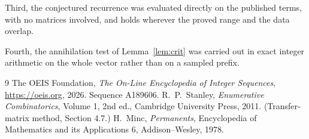 \documentclass[11pt,a4paper]{article}
\theoremstyle{plain}
\theoremstyle{definition}
\begin{document}
Third, the conjectured recurrence was evaluated directly on the published terms, with no
matrices involved, and holds wherever the proved range and the data overlap.

Fourth, the annihilation test of Lemma~\ref{lem:crit} was carried out in exact integer
arithmetic on the whole vector rather than on a sampled prefix.

\begin{thebibliography}{9}
 The OEIS Foundation, \emph{The On-Line Encyclopedia of Integer
Sequences}, \url{https://oeis.org}, 2026. Sequence A189606.
 R.~P.~Stanley, \emph{Enumerative Combinatorics}, Volume 1, 2nd ed.,
Cambridge University Press, 2011. (Transfer-matrix method, Section 4.7.)
 H.~Minc, \emph{Permanents}, Encyclopedia of Mathematics and its
Applications 6, Addison--Wesley, 1978.
\end{thebibliography}
\end{document}
